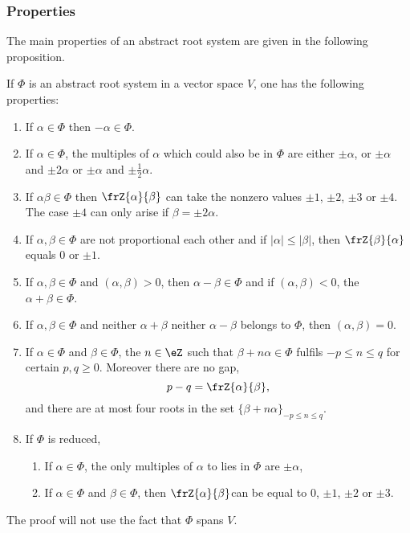 \subsubsection{Properties}

The main properties of an abstract root system are given in the  following proposition.
\begin{proposition}     \label{PropPropAbstrRootviiiikl}
If $\Phi$ is an abstract root system in a vector space $V$, one has the following properties:

\begin{enumerate}
\item\label{enubi} If $\alpha\in\Phi$ then $-\alpha\in\Phi$.

\item\label{enubii} If $\alpha\in\Phi$, the multiples of $\alpha$ which could also be in $\Phi$ are either $\pm\alpha$, or $\pm\alpha$ and $\pm 2\alpha$ or $\pm\alpha$ and $\pm\frac{1}{2}\alpha$.

\item\label{enubiii} If $\alpha\beta\in\Phi$ then $\frZ{\alpha}{\beta}$ can take the nonzero values $\pm 1$, $\pm 2$, $\pm 3$ or $\pm 4$. The case $\pm 4$ can only arise if $\beta=\pm 2\alpha$.

\item\label{enubiv} If $\alpha,\beta\in\Phi$ are not proportional each other and if $|\alpha|\leq|\beta|$, then $\frZ{\beta}{\alpha}$ equals $0$ or $\pm 1$.

\item\label{enubv} If $\alpha,\beta\in\Phi$ and $(\alpha,\beta)>0$, then $\alpha-\beta\in\Phi$ and if $(\alpha,\beta)<0$, the $\alpha+\beta\in\Phi$.

\item\label{enubvi} If $\alpha,\beta\in\Phi$ and neither $\alpha+\beta$ neither $\alpha-\beta$ belongs to $\Phi$, then $(\alpha,\beta)=0$.

\item\label{enubvii} If $\alpha\in\Phi$ and $\beta\in\Phi$, the $n\in\eZ$ such that $\beta+n\alpha\in\Phi$ fulfils $-p\leq n\leq q$ for certain $p,q\geq 0$. Moreover there are no gap,
\[
   p-q=\frZ{\alpha}{\beta},
\]
and there are at most four roots in the set $\{\beta+n\alpha\}_{-p\leq n\leq q}$.

\item\label{enubviii} If $\Phi$ is reduced,

\begin{enumerate}
\item\label{enubviiia} If $\alpha\in\Phi$, the only multiples of $\alpha$ to lies in $\Phi$ are $\pm\alpha$,
\item\label{enubviiib} If $\alpha\in\Phi$ and $\beta\in\Phi$, then $\frZ{\alpha}{\beta}$can be equal to $0$, $\pm 1$, $\pm 2$ or $\pm 3$.
\end{enumerate}
\end{enumerate} \label{prop:Cartan_matr}
\end{proposition}
The proof will not use the fact that $\Phi$ spans $V$.

